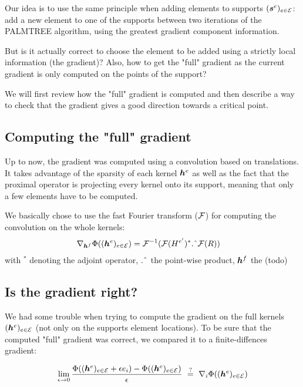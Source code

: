 Our idea is to use the same principle when adding elements to supports $(\bm{s}^e)_{e \in \mathcal E}$: add a new element to one of the supports between two iterations of the PALMTREE algorithm, using the greatest gradient component information.

But is it actually correct to choose the element to be added using a strictly local information (the gradient)? Also, how to get the "full" gradient as the current gradient is only computed on the points of the support?

We will first review how the "full" gradient is computed and then describe a way to check that the gradient gives a good direction towards a critical point.

\subsection{Computing the "full" gradient}
Up to now, the gradient was computed using a convolution based on translations. It takes advantage of the sparsity of each kernel $\bm{h}^e$ as well as the fact that the proximal operator is projecting every kernel onto its support, meaning that only a few elements have to be computed.

We basically chose to use the fast Fourier transform (${\mathcal F}$) for computing the convolution on the whole kernels:
\begin{align*}
	\nabla_{\bm{h}^f} \Phi((\bm{h}^e)_{e \in \mathcal E})&= {\mathcal F}^{-1}({\mathcal F}(H^{e'})^* \text{.\^{}} {\mathcal F}(R))
\end{align*}
with ${}^*$ denoting the adjoint operator, $\text{.\^{}}$ the point-wise product, $\bm{h}^{f}$ the (todo) %

\subsection{Is the gradient right?}
We had some trouble when trying to compute the gradient on the full kernels $(\bm{h}^e)_{e \in \mathcal E}$ (not only on the supports element locations). To be sure that the computed "full" gradient was correct, we compared it to a finite-diffences gradient:

$$\lim_{\epsilon \rightarrow 0} \frac{\Phi((\bm{h}^e)_{e \in \mathcal E}+\epsilon e_i) - \Phi ((\bm{h}^e)_{e \in \mathcal E}) }{\epsilon} ~\overset{?}{=}~ \nabla_i \Phi ((\bm{h}^e)_{e \in \mathcal E})$$

